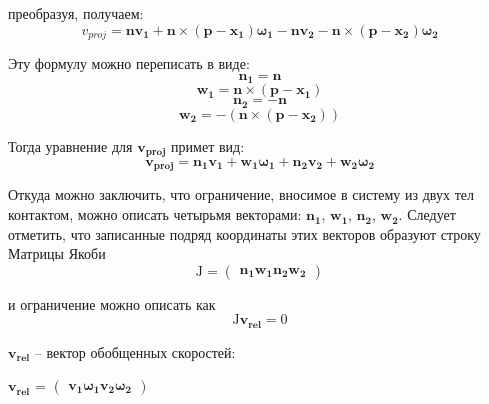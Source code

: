 преобразуя, получаем: 
\begin{equation}
    v_{proj} = \mathbf{n} \mathbf{v_1} + \mathbf{n} \times (\mathbf{p} - \mathbf{x_1}) \mathbf{\omega_{1}} 
    -  \mathbf{n} \mathbf{v_2} - \mathbf{n} \times (\mathbf{p} - \mathbf{x_2}) \mathbf{\omega_{2}}
\end{equation}

Эту формулу можно переписать в виде:
\begin{equation}
 \mathbf{n_1} = \mathbf{n} 
\end{equation}
\begin{equation}
 \mathbf{w_{1}} =  \mathbf{n} \times  (\mathbf{p} - \mathbf{x_1})
 \end{equation} 
\begin{equation}
 \mathbf{n_2} = -\mathbf{n}
 \end{equation} 
\begin{equation}
 \mathbf{w_{2}} = -(\mathbf{n} \times (\mathbf{p} - \mathbf{x_2})) 
\end{equation}

Тогда уравнение для $\mathbf{v_{proj}}$ примет вид:
\begin{equation}
 \mathbf{v_{proj}} = \mathbf{n_{1}} \mathbf{v_{1}} + \mathbf{w_{1}} \mathbf{\omega_{1}}
		 + \mathbf{n_2} \mathbf{v_{2}} + \mathbf{w_{2}} \mathbf{\omega_{2}}
\end{equation}

Откуда можно заключить, что ограничение, вносимое в систему из двух тел контактом, можно описать четырьмя векторами: $\mathbf{n_1}$, $\mathbf{w_1}$,
$\mathbf{n_2}$, $\mathbf{w_2}$.
Следует отметить, что записанные подряд координаты этих векторов образуют строку Матрицы Якоби
\begin{equation}
    \mathrm{J} = 
    \begin{pmatrix} 
     \mathbf{n_1} \mathbf{w_1} \mathbf{n_2} \mathbf{w_2}
     \end{pmatrix}
\end{equation}

и ограничение можно описать как
\begin{equation}
 \mathrm{J} \mathbf{v_{rel}} = 0
\end{equation}
\begin{eqrem}
 $\mathbf{v_{rel}}$ -- вектор обобщенных скоростей: 
 
 $\mathbf{v_{rel}}$ = 
 $\begin{pmatrix} 
     \mathbf{v_1} \mathbf{\omega_{1}} \mathbf{v_2} \mathbf{\omega_{2}}
  \end{pmatrix}$
\end{eqrem}

